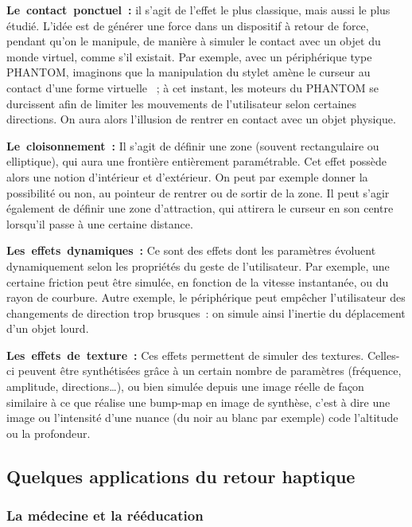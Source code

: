 \documentclass[
]{book}
\begin{document}
\textbf{Le~contact~ponctuel~:}
il s'agit de l'effet le plus classique, mais
aussi le plus étudié. L'idée est de générer une force dans un dispositif à
retour de force, pendant qu'on le manipule, de manière à simuler le contact
avec un objet du monde virtuel, comme s'il existait. Par exemple, avec un
périphérique type PHANTOM, imaginons que la manipulation du stylet amène le
curseur au contact d'une forme virtuelle ~; à cet instant, les moteurs du
PHANTOM se durcissent afin de limiter les mouvements de l'utilisateur selon
certaines directions. On aura alors l'illusion de rentrer en contact avec
un objet physique.

\textbf{Le~cloisonnement~:}
Il s'agit de définir une zone (souvent
rectangulaire ou elliptique), qui aura une frontière entièrement
paramétrable. Cet effet possède alors une notion d'intérieur et
d'extérieur. On peut par exemple donner la possibilité ou non, au pointeur
de rentrer ou de sortir de la zone. Il peut s'agir également de définir une
zone d'attraction, qui attirera le curseur en son centre lorsqu'il passe à
une certaine distance.

\textbf{Les~effets~dynamiques~:}
Ce sont des effets dont les paramètres évoluent
dynamiquement selon les propriétés du geste de l'utilisateur. Par exemple,
une certaine friction peut être simulée, en fonction de la vitesse
instantanée, ou du rayon de courbure. Autre exemple, le périphérique peut
empêcher l'utilisateur des changements de direction trop brusques~: on
simule ainsi l'inertie du déplacement d'un objet lourd.

\textbf{Les~effets~de~texture~:}
Ces effets permettent de simuler des textures.
Celles-ci peuvent être synthétisées grâce à un certain nombre de paramètres
(fréquence, amplitude, directions\ldots), ou bien simulée depuis une image
réelle de façon similaire à ce que réalise une bump-map en image de
synthèse, c'est à dire une image ou l'intensité d'une nuance (du noir au
blanc par exemple) code l'altitude ou la profondeur.

\hypertarget{quelques-applications-du-retour-haptique}{%
\subsection{Quelques applications du retour haptique}\label{quelques-applications-du-retour-haptique}}

\hypertarget{la-muxe9decine-et-la-ruxe9uxe9ducation}{%
\subsubsection{La médecine et la rééducation}\label{la-muxe9decine-et-la-ruxe9uxe9ducation}}
\end{document}
